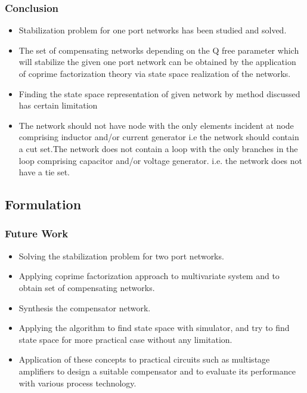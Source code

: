 \documentclass{beamer}
\begin{document}
\begin{frame}
\frametitle{Conclusion}

\begin{small}
        \begin{itemize}
 \item Stabilization problem for one port networks has been studied and solved.
\item The set of compensating networks depending on the Q free parameter which will stabilize the given one port network can be obtained by the application of coprime factorization theory via state space realization of the networks. 
\item Finding the state space representation of given network by method discussed has certain limitation
\item The network should not have node with the only elements incident at node comprising inductor and/or current generator i.e the network should contain a cut set.The network does not contain a loop with the only branches in the loop comprising capacitor and/or voltage generator. i.e. the network does not have a tie set.

        \end{itemize}
\end{small}
\end{frame}


\subsection*{Formulation}

\begin{frame}
\frametitle{Future Work}

\begin{small}
        \begin{itemize}
 \item Solving the stabilization problem for two port networks.
 \item Applying coprime factorization approach to multivariate system and to obtain set of compensating networks.
 \item Synthesis the compensator network. 
 \item Applying the algorithm to find state space with simulator, and try to find state space for more practical case without any limitation.
 \item Application of these concepts to practical circuits such as multistage amplifiers to design a suitable compensator and to evaluate its performance with various process technology.
        \end{itemize}
\end{small}
\end{frame}
\end{document}

